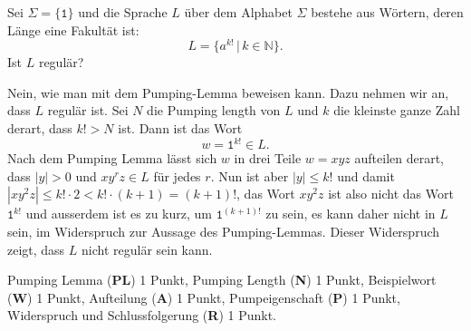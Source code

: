 Sei $\Sigma=\{\texttt{1}\}$ und die Sprache $L$ über dem Alphabet $\Sigma$
bestehe aus Wörtern, deren Länge eine Fakultät ist:
\[
L=\{
a^{k!}\,|\, k\in \mathbb N
\}.
\]
Ist $L$ regulär?


\begin{loesung}
Nein, wie man mit dem Pumping-Lemma beweisen kann.
Dazu nehmen wir an, dass $L$ regulär ist.
Sei $N$ die Pumping length von $L$ und $k$ die kleinste ganze Zahl
derart, dass $k!>N$ ist.
Dann ist das Wort
\[
w=\texttt{1}^{k!} \in L.
\]
Nach dem Pumping Lemma lässt sich $w$ in drei Teile $w=xyz$ aufteilen
derart, dass $|y|>0$ und $xy^rz\in L$ für jedes $r$.
Nun ist aber $|y|\le k!$ und damit $|xy^2z|\le k!\cdot 2 < k!\cdot (k+1) = (k+1)!$, 
das Wort $xy^2z$ ist also nicht das Wort $\texttt{1}^{k!}$ und ausserdem
ist es zu kurz,
um $\texttt{1}^{(k+1)!}$ zu sein, es kann daher nicht in $L$ sein,
im Widerspruch zur Aussage des Pumping-Lemmas.
Dieser Widerspruch zeigt, dass $L$ nicht regulär sein kann.
\end{loesung}

\begin{bewertung}
Pumping Lemma ({\bf PL}) 1 Punkt,
Pumping Length ({\bf N}) 1 Punkt,
Beispielwort ({\bf W}) 1 Punkt,
Aufteilung ({\bf A}) 1 Punkt,
Pumpeigenschaft ({\bf P}) 1 Punkt,
Widerspruch und Schlussfolgerung ({\bf R}) 1 Punkt.
\end{bewertung}

